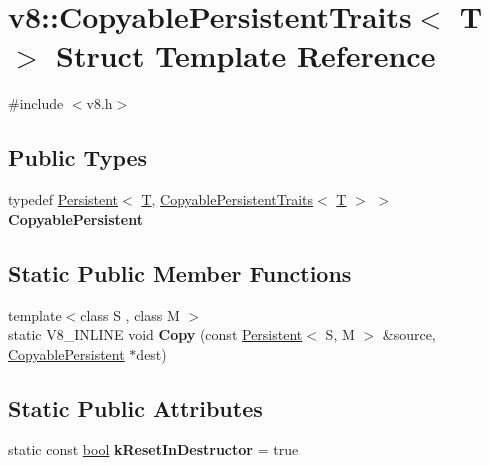 \hypertarget{structv8_1_1CopyablePersistentTraits}{}\section{v8\+:\+:Copyable\+Persistent\+Traits$<$ T $>$ Struct Template Reference}
\label{structv8_1_1CopyablePersistentTraits}


{\ttfamily \#include $<$v8.\+h$>$}

\subsection*{Public Types}
\begin{DoxyCompactItemize}
\item 
\mbox{\label{structv8_1_1CopyablePersistentTraits_a327724a22ee06da5ae54dd29982d068e}} 
typedef \mbox{\hyperlink{classv8_1_1Persistent}{Persistent}}$<$ \mbox{\hyperlink{classv8_1_1internal_1_1torque_1_1T}{T}}, \mbox{\hyperlink{structv8_1_1CopyablePersistentTraits}{Copyable\+Persistent\+Traits}}$<$ \mbox{\hyperlink{classv8_1_1internal_1_1torque_1_1T}{T}} $>$ $>$ {\bfseries Copyable\+Persistent}
\end{DoxyCompactItemize}
\subsection*{Static Public Member Functions}
\begin{DoxyCompactItemize}
\item 
\mbox{\label{structv8_1_1CopyablePersistentTraits_aa8adf12936633b5f13b624541acaa1cf}} 
{\footnotesize template$<$class S , class M $>$ }\\static V8\+\_\+\+I\+N\+L\+I\+NE void {\bfseries Copy} (const \mbox{\hyperlink{classv8_1_1Persistent}{Persistent}}$<$ S, M $>$ \&source, \mbox{\hyperlink{classv8_1_1Persistent}{Copyable\+Persistent}} $\ast$dest)
\end{DoxyCompactItemize}
\subsection*{Static Public Attributes}
\begin{DoxyCompactItemize}
\item 
\mbox{\label{structv8_1_1CopyablePersistentTraits_a1a10842e15d8ee11f78da030bdffd025}} 
static const \mbox{\hyperlink{classbool}{bool}} {\bfseries k\+Reset\+In\+Destructor} = true
\end{DoxyCompactItemize}


